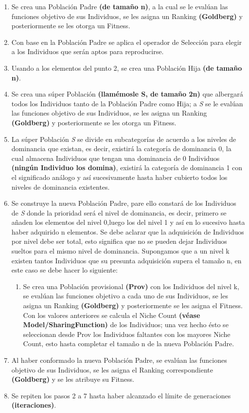 \documentclass[class=report, crop=false]{standalone}
\begin{document}
\begin{enumerate}
\item Se crea una Población Padre \textbf{(de tamaño n)}, a la cual se le evalúan las funciones objetivo de sus Individuos, se les asigna un Ranking \textbf{(Goldberg)} y posteriormente se les otorga un Fitness.
\item Con base en la Población Padre se aplica el operador de Selección para elegir a los Individuos que serán aptos para reproducirse.
\item Usando a los elementos del punto 2, se crea una Población Hija \textbf{(de tamaño n)}.
\item Se crea una súper Población \textbf{(llamémosle S, de tamaño 2n)} que albergará todos los Individuos tanto de la Población Padre como Hija; a \emph{S} se le evalúan las funciones objetivo de sus Individuos, se les asigna un Ranking \textbf{(Goldberg)} y posteriormente se les otorga un Fitness.
\item La súper Población \emph{S} se divide en subcategorías de acuerdo a los niveles de dominancia que existan, es decir, existirá la categoría de dominancia 0, la cual almacena Individuos que tengan una dominancia de 0 Individuos \textbf{(ningún Individuo los domina)}, existirá la categoría de dominancia 1 con el significado análogo y así sucesivamente hasta haber cubierto todos los niveles de dominancia existentes.
\item Se construye la nueva Población Padre, pare ello constará de los Individuos de \emph{S} donde la prioridad será el nivel de dominancia, es decir, primero se añaden los elementos del nivel 0,luego los del nivel 1 y así en lo sucesivo hasta haber adquirido n elementos.
Se debe aclarar que la adquisición de Individuos por nivel debe ser total, esto significa que no se pueden dejar Individuos sueltos para el mismo nivel de dominancia.\break
Supongamos que a un nivel k existen tantos Individuos que su presunta adquisición supera el tamaño n, en este caso se debe hacer lo siguiente:
      \begin{enumerate}
      \item Se crea una Población provisional \textbf{(Prov)} con los Individuos del nivel k, se evalúan las funciones objetivo a cada uno de sus Individuos, se les asigna un Ranking \textbf{(Goldberg)} y posteriormente se les asigna el Fitness.\break
            Con los valores anteriores se calcula el Niche Count \textbf{(véase Model/SharingFunction)} de los Individuos; una vez hecho ésto se seleccionan desde Prov los Individuos faltantes con los mayores Niche Count, esto hasta completar el tamaño n de la nueva Población Padre.
      \end{enumerate}
\item Al haber conformado la nueva Población Padre, se evalúan las funciones objetivo de sus Individuos, se les asigna el Ranking correspondiente \textbf{(Goldberg)} y se les atribuye su Fitness.
\item Se repiten los pasos 2 a 7 hasta haber alcanzado el límite de generaciones \textbf{(iteraciones)}.
\end{enumerate}
\end{document}
